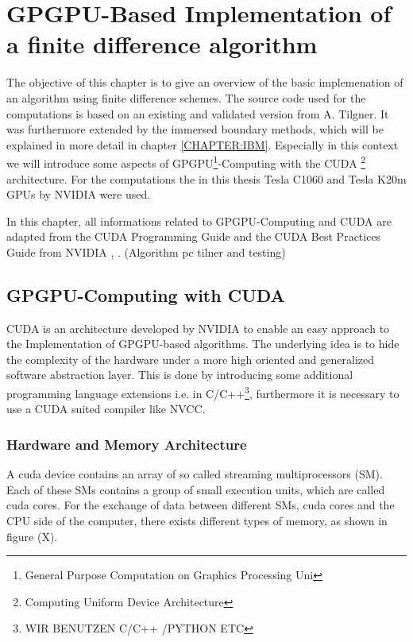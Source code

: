 \chapter[ GPGPU-Based Implementation of a finite difference algorithm]{GPGPU-Based Implementation of \\ a finite difference algorithm}


The objective of this chapter is to give an overview of the basic implemenation of an algorithm using finite difference schemes.
The source code used for the computations is based on an existing and validated version from A. Tilgner.
It was furthermore extended by the immersed boundary methods, which will be explained in more detail in chapter \ref{CHAPTER:IBM}.
Especially in this context we will introduce some aspects of GPGPU\footnote{General Purpose Computation on Graphics Processing Uni}-Computing
with the CUDA \footnote{Computing Uniform Device Architecture} architecture.
For the computations the  in this thesis Tesla C1060 and Tesla K20m GPUs by NVIDIA were used.%

In this chapter, all informations related to GPGPU-Computing and CUDA are adapted from the CUDA Programming Guide and the CUDA Best Practices Guide from NVIDIA
\citep{CUDAPG}, \citep{CUDABP}. (Algorithm pc tilner and testing)

\section{GPGPU-Computing with CUDA}

CUDA is an architecture developed by NVIDIA to enable an easy approach to the Implementation of GPGPU-based algorithms.
The underlying idea is to hide the complexity of the hardware under a more high oriented and generalized software abstraction layer.
This is done by introducing some additional programming language extensions i.e. in C/C++\footnote{WIR BENUTZEN C/C++ /PYTHON ETC},
furthermore it is necessary to use a CUDA suited compiler like NVCC.

\subsection{Hardware and Memory Architecture}

A cuda device contains an array of so called streaming multiprocessors (SM).
Each of these SMs contains a group of small execution units, which are called cuda cores.
For the exchange of data between different SMs, cuda cores and the CPU side of the computer, there exists different
types of memory, as shown  in figure (X).
\newpage


